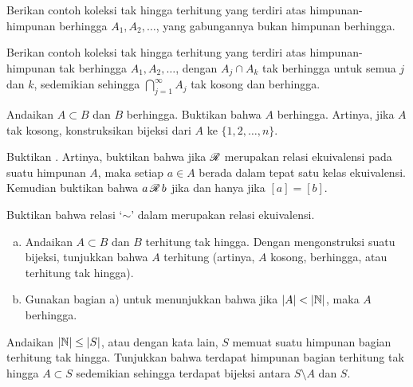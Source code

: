 \begin{exercise}
Berikan contoh koleksi tak hingga terhitung yang terdiri atas himpunan-himpunan berhingga $A_1, A_2, \ldots$,
yang gabungannya bukan himpunan berhingga.
\end{exercise}

\begin{exercise}
Berikan contoh koleksi tak hingga terhitung yang terdiri atas himpunan-himpunan tak berhingga $A_1, A_2, \ldots$,
dengan $A_j \cap A_k$ tak berhingga untuk semua $j$ dan $k$, sedemikian sehingga
$\bigcap_{j=1}^\infty A_j$
tak kosong dan berhingga.
\end{exercise}

\begin{exercise}
Andaikan $A \subset B$ dan $B$ berhingga. Buktikan bahwa $A$ berhingga.
Artinya, jika $A$ tak kosong, konstruksikan bijeksi dari $A$ ke $\{ 1,2,\ldots,n \}$.
\end{exercise}

\begin{exercise}
Buktikan .  Artinya, buktikan bahwa jika ${\mathscr{R}}$ merupakan
relasi ekuivalensi pada suatu himpunan $A$, maka setiap $a \in A$ berada dalam tepat satu
kelas ekuivalensi.  Kemudian buktikan bahwa $a \, {\mathscr{R}} \, b$ jika dan hanya jika $[a] =
[b]$.
\end{exercise}

\begin{exercise}
Buktikan bahwa relasi `$\sim$'
dalam  merupakan relasi
ekuivalensi.
\end{exercise}

\begin{exercise}
\leavevmode
\begin{enumerate}[a)]
\item
Andaikan $A \subset B$ dan $B$ terhitung tak hingga.  Dengan mengonstruksi suatu
bijeksi, tunjukkan bahwa $A$
terhitung (artinya, $A$ kosong, berhingga, atau terhitung tak hingga).
\item 
Gunakan bagian a) untuk menunjukkan bahwa jika $\lvert {A} \rvert < \lvert {{\mathbb{N}}} \rvert$, maka $A$ berhingga.
\end{enumerate}
\end{exercise}

\begin{exercise}[Menantang] \label{exercise:countsubsetbij}
Andaikan $\lvert {{\mathbb{N}}} \rvert \leq \lvert {S} \rvert$, atau dengan kata lain, $S$
memuat suatu himpunan bagian terhitung tak hingga.
Tunjukkan bahwa terdapat himpunan bagian terhitung tak hingga $A \subset S$
sedemikian sehingga terdapat
bijeksi antara $S \setminus A$ dan $S$.
\end{exercise}

